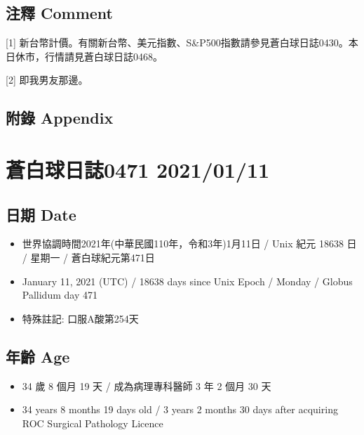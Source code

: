 \documentclass[
]{article}
\providecommand{\tightlist}{%
  \setlength{\itemsep}{0pt}\setlength{\parskip}{0pt}}
\begin{document}
\hypertarget{ux6ce8ux91cb-comment-9}{%
\subsection{注釋 Comment}\label{ux6ce8ux91cb-comment-9}}

{[}1{]}
新台幣計價。有關新台幣、美元指數、S\&P500指數請參見蒼白球日誌0430。本日休市，行情請見蒼白球日誌0468。

{[}2{]} 即我男友那邊。

\hypertarget{ux9644ux9304-appendix-9}{%
\subsection{附錄 Appendix}\label{ux9644ux9304-appendix-9}}

\hypertarget{ux84bcux767dux7403ux65e5ux8a8c0471-20210111}{%
\section{蒼白球日誌0471
2021/01/11}\label{ux84bcux767dux7403ux65e5ux8a8c0471-20210111}}

\hypertarget{ux65e5ux671f-date-10}{%
\subsection{日期 Date}\label{ux65e5ux671f-date-10}}

\begin{itemize}
\tightlist
\item
  世界協調時間2021年(中華民國110年，令和3年)1月11日 / Unix 紀元 18638 日
  / 星期一 / 蒼白球紀元第471日
\item
  January 11, 2021 (UTC) / 18638 days since Unix Epoch / Monday / Globus
  Pallidum day 471
\item
  特殊註記: 口服A酸第254天
\end{itemize}

\hypertarget{ux5e74ux9f61-age-10}{%
\subsection{年齡 Age}\label{ux5e74ux9f61-age-10}}

\begin{itemize}
\tightlist
\item
  34 歲 8 個月 19 天 / 成為病理專科醫師 3 年 2 個月 30 天
\item
  34 years 8 months 19 days old / 3 years 2 months 30 days after
  acquiring ROC Surgical Pathology Licence
\end{itemize}
\end{document}
